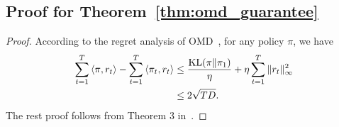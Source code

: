 
\subsection{Proof for Theorem~\ref{thm:omd_guarantee}}\label{sec:proof_omd}
\begin{proof}
According to the regret analysis of OMD~\citep{lattimore2020bandit}, for any policy $\pi$, we have
\begin{align*}
\sum_{t=1}^T \left\langle\pi,r_t\right\rangle-\sum_{t=1}^T \left\langle\pi_t,r_t\right\rangle &\le \frac{\mathrm{KL}(\pi \Vert \pi_1)}{\eta}+\eta \sum_{t=1}^T \|r_t\|^2_{\infty} \\
&\le 2 \sqrt{TD}.
\end{align*}
The rest proof follows from Theorem 3 in~\citet{zhang2024iterative}.
\end{proof}


